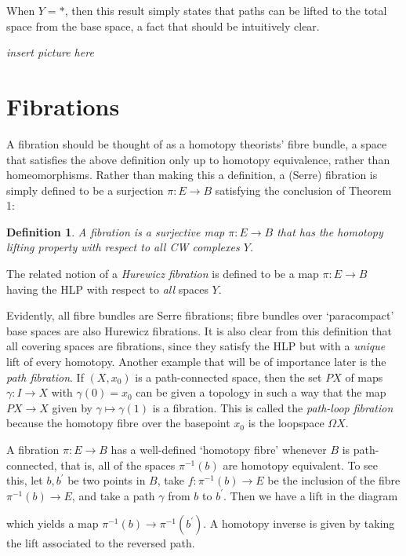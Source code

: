 \documentclass[11pt]{article}
\newcommand{\inv}{^{-1}}
\newcommand{\dash}{^{\prime}}
\newtheorem{definition}{Definition}
\begin{document}
When $Y = \ast$, then this result simply states that paths can be lifted to the total space from the base space, a fact that should be intuitively clear.
\begin{center}
\textit{insert picture here}
\end{center}

\section*{Fibrations}

A fibration should be thought of as a homotopy theorists' fibre bundle, a space that satisfies the above definition only up to homotopy equivalence, rather than homeomorphisms. Rather than making this a definition, a (Serre) fibration is simply defined to be a surjection $\pi: E \to B$ satisfying the conclusion of Theorem 1:
\begin{definition}
A fibration is a surjective map $\pi: E \to B$  that has the homotopy lifting property with respect to all CW complexes $Y$. 
\end{definition}
The related notion of a \textit{Hurewicz fibration} is defined to be a map $\pi : E \to B$ having the HLP with respect to \textit{all} spaces $Y$. 

Evidently, all fibre bundles are Serre fibrations; fibre bundles over `paracompact' base spaces are also Hurewicz fibrations. It is also clear from this definition that all covering spaces are fibrations, since they satisfy the HLP but with a \textit{unique} lift of every homotopy. Another example that will be of importance later is the \textit{path fibration}. If $(X,x_0)$ is a path-connected space, then the set $PX$ of maps $\gamma: I \to X$ with $\gamma(0) = x_0$ can be given a topology in such a way that the map $PX \to X$ given by $\gamma \mapsto \gamma(1)$ is a fibration. This is called the \textit{path-loop fibration} because the homotopy fibre over the basepoint $x_0$ is the loopspace $\Omega X$.

A fibration $\pi: E \to B$ has a well-defined `homotopy fibre' whenever $B$ is path-connected, that is, all of the spaces $\pi^{-1}(b)$ are homotopy equivalent. To see this, let $b, b\dash$ be two points in $B$, take $f: \pi\inv(b) \to E$ be the inclusion of the fibre $\pi^{-1}(b) \to E$, and take a path $\gamma$ from $b$ to $b\dash$. Then we have a lift in the diagram
\begin{center}
\end{center}
which yields a map $\pi\inv(b) \to \pi\inv(b\dash)$. A homotopy inverse is given by taking the lift associated to the reversed path.
\end{document}

